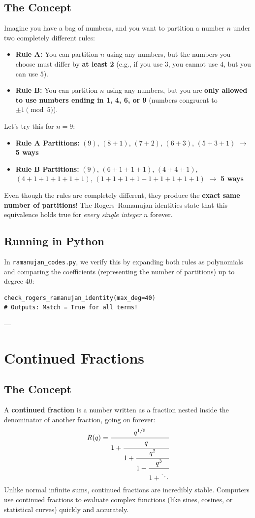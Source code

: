 \documentclass[11pt]{article}
\begin{document}
\subsection{The Concept}
Imagine you have a bag of numbers, and you want to partition a number $n$ under two completely different rules:
\begin{itemize}
    \item \textbf{Rule A:} You can partition $n$ using any numbers, but the numbers you choose must differ by \textbf{at least 2} (e.g., if you use $3$, you cannot use $4$, but you can use $5$).
    \item \textbf{Rule B:} You can partition $n$ using any numbers, but you are \textbf{only allowed to use numbers ending in 1, 4, 6, or 9} (numbers congruent to $\pm 1 \pmod{5}$).
\end{itemize}

Let's try this for $n=9$:
\begin{itemize}
    \item \textbf{Rule A Partitions:} $(9)$, $(8+1)$, $(7+2)$, $(6+3)$, $(5+3+1)$ $\to$ \textbf{5 ways}
    \item \textbf{Rule B Partitions:} $(9)$, $(6+1+1+1)$, $(4+4+1)$, $(4+1+1+1+1+1)$, $(1+1+1+1+1+1+1+1+1)$ $\to$ \textbf{5 ways}
\end{itemize}
Even though the rules are completely different, they produce the \textbf{exact same number of partitions}! The Rogers--Ramanujan identities state that this equivalence holds true for \emph{every single integer} $n$ forever.

\subsection{Running in Python}
In \texttt{ramanujan\_codes.py}, we verify this by expanding both rules as polynomials and comparing the coefficients (representing the number of partitions) up to degree 40:
\begin{lstlisting}
check_rogers_ramanujan_identity(max_deg=40)
# Outputs: Match = True for all terms!
\end{lstlisting}

---

\section{Continued Fractions}

\subsection{The Concept}
A \textbf{continued fraction} is a number written as a fraction nested inside the denominator of another fraction, going on forever:
\[
R(q) = \cfrac{q^{1/5}}{1 + \cfrac{q}{1 + \cfrac{q^2}{1 + \cfrac{q^3}{1 + \ddots}}}}
\]
Unlike normal infinite sums, continued fractions are incredibly stable. Computers use continued fractions to evaluate complex functions (like sines, cosines, or statistical curves) quickly and accurately.
\end{document}
